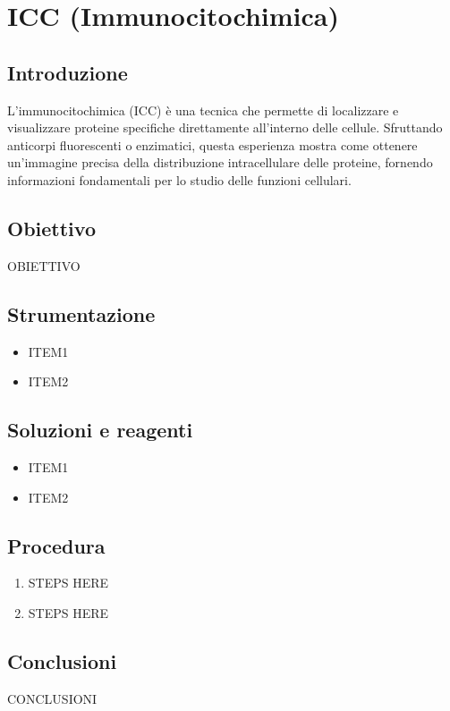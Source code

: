 \section {ICC (Immunocitochimica)}

\subsection{Introduzione}
L’immunocitochimica (ICC) è una tecnica che permette di localizzare e visualizzare proteine specifiche direttamente all’interno delle cellule. Sfruttando anticorpi fluorescenti o enzimatici, questa esperienza mostra come ottenere un’immagine precisa della distribuzione intracellulare delle proteine, fornendo informazioni fondamentali per lo studio delle funzioni cellulari.

\subsection{Obiettivo}
OBIETTIVO

\subsection{Strumentazione}
\begin{itemize}
  \item ITEM1
  \item ITEM2
\end{itemize}

\subsection{Soluzioni e reagenti}
\begin{itemize}
  \item ITEM1
  \item ITEM2
\end{itemize}

\subsection{Procedura}
\begin{enumerate}
  \item STEPS HERE
  \item STEPS HERE
\end{enumerate}

\subsection{Conclusioni}

CONCLUSIONI
\newpage